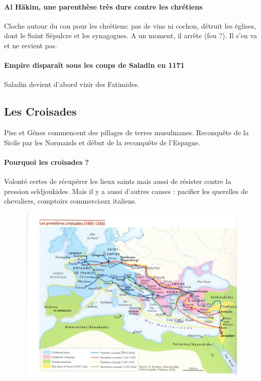 \paragraph{Al Häkim, une parenthèse très dure contre les chrétiens} Cloche autour du cou pour les chrétiens; pas de vins ni cochon, détruit les églises, dont le Saint Sépulcre et les synagogues.
A un moment, il arrête (fou ?). Il s'en va et ne revient pas. 

\paragraph{Empire disparaît sous les coups de Saladin en 1171} Saladin devient d'abord vizir des Fatimides. 

\subsection{Les Croisades}


Pise et Gênes commencent des pillages de terres musulmanes.
Reconquête de la Sicile par les Normands et début de la reconquête de l'Espagne.
\paragraph{Pourquoi les croisades ?}
Volonté certes de récupérer les lieux saints mais aussi de résister contre la pression seldjoukides. 
Mais il y a aussi d'autres causes : pacifier les querelles de chevaliers, comptoirs commerciaux italiens. 

 \begin{figure}[h!]
\centering
{}
\includegraphics[width=\textwidth]{HistoireIslamMediterranee/Images/Croisade.jpg}
     
     \label{fig:Croisade}
 \end{figure}


